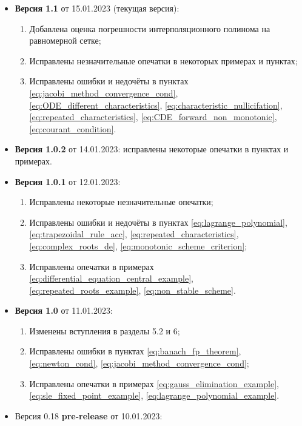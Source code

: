 \documentclass{article}
\begin{document}

\begin{itemize}[nosep]
\item \textbf{Версия 1.1} от 15.01.2023 (текущая версия):
	\begin{enumerate}[nosep]
		\item Добавлена оценка погрешности интерполяционного
			полинома на равномерной сетке;
		\item Исправлены незначительные опечатки в некоторых примерах и
			пунктах;
		\item Исправлены ошибки и недочёты в пунктах
			\eqref{eq:jacobi_method_convergence_cond},
			\eqref{eq:ODE_different_characteristics},
			\eqref{eq:characteristic_nullicifation},
			\eqref{eq:repeated_characteristics},
			\eqref{eq:CDE_forward_non_monotonic},
			\eqref{eq:courant_condition}.
	\end{enumerate}
\item \textbf{Версия 1.0.2} от 14.01.2023: исправлены некоторые
	опечатки в пунктах и примерах.
\item \textbf{Версия 1.0.1} от 12.01.2023:
	\begin{enumerate}[nosep]
		\item Исправлены некоторые незначительные опечатки;
		\item Исправлены ошибки и недочёты в пунктах
			\eqref{eq:lagrange_polynomial},
			\eqref{eq:trapezoidal_rule_acc},
			\eqref{eq:repeated_characteristics},
			\eqref{eq:complex_roots_de},
			\eqref{eq:monotonic_scheme_criterion};
		\item Исправлены опечатки в примерах
			\eqref{eq:differential_equation_central_example},
			\eqref{eq:repeated_roots_example},
			\eqref{eq:non_stable_scheme}.
	\end{enumerate}
\item \textbf{Версия 1.0} от 11.01.2023:
	\begin{enumerate}[nosep]
		\item Изменены вступления в разделы 5.2 и 6;
		\item Исправлены ошибки в пунктах
			\eqref{eq:banach_fp_theorem},
			\eqref{eq:newton_cond},
			\eqref{eq:jacobi_method_convergence_cond};
		\item Исправлены опечатки в примерах
			\eqref{eq:gauss_elimination_example},
			\eqref{eq:sle_fixed_point_example},
			\eqref{eq:lagrange_polynomial_example}.
	\end{enumerate}
\item Версия 0.18 \textbf{pre-release} от 10.01.2023:

\end{itemize}
\end{document}
